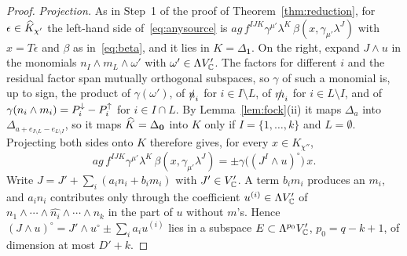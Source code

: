 \begin{proof}
\emph{Projection.} As in Step~1 of the proof of Theorem~\ref{thm:reduction}, for $\epsilon\in\widehat{K}_{\chi'}$ the left-hand side of~\eqref{eq:anysource} is $ag\,f^{IJK}\gamma^{\mu'}\lambda^K\,\beta(x,\gamma_{\mu'}\lambda^J)$ with $x=T\epsilon$ and $\beta$ as in~\eqref{eq:beta}, and it lies in $K=\Delta_{\mathbf 1}$. On the right, expand $J\wedge u$ in the monomials $n_I\wedge m_L\wedge\omega'$ with $\omega'\in\Lambda V'_{\mathbb{C}}$. The factors for different $i$ and the residual factor span mutually orthogonal subspaces, so $\gamma$ of such a monomial is, up to sign, the product of $\gamma(\omega')$, of $\slashed{n}_i$ for $i\in I\setminus L$, of $\slashed{m}_i$ for $i\in L\setminus I$, and of $\gamma(n_i\wedge m_i)=P^{\downarrow}_i-P^{\uparrow}_i$ for $i\in I\cap L$. By Lemma~\ref{lem:fock}(ii) it maps $\Delta_a$ into $\Delta_{a+e_{I\setminus L}-e_{L\setminus I}}$, so it maps $\widehat{K}=\Delta_{\mathbf 0}$ into $K$ only if $I=\{1,\dots,k\}$ and $L=\emptyset$. Projecting both sides onto $K$ therefore gives, for every $x\in K_{\chi''}$,
\begin{equation}
\label{eq:anyproj}
ag\,f^{IJK}\gamma^{\mu'}\lambda^K\,\beta(x,\gamma_{\mu'}\lambda^J)=\pm\gamma\bigl((J^I\wedge u)^\circ\bigr)\,x .
\end{equation}
Write $J=J'+\sum_i(a_in_i+b_im_i)$ with $J'\in V'_{\mathbb{C}}$. A term $b_im_i$ produces an $m_i$, and $a_in_i$ contributes only through the coefficient $u^{(i)}\in\Lambda V'_{\mathbb{C}}$ of $n_1\wedge\cdots\wedge\widehat{n_i}\wedge\cdots\wedge n_k$ in the part of $u$ without $m$'s. Hence $(J\wedge u)^\circ=J'\wedge u^\circ\pm\sum_ia_iu^{(i)}$ lies in a subspace $E\subset\Lambda^{p_0}V'_{\mathbb{C}}$, $p_0=q-k+1$, of dimension at most $D'+k$.


\end{proof}
